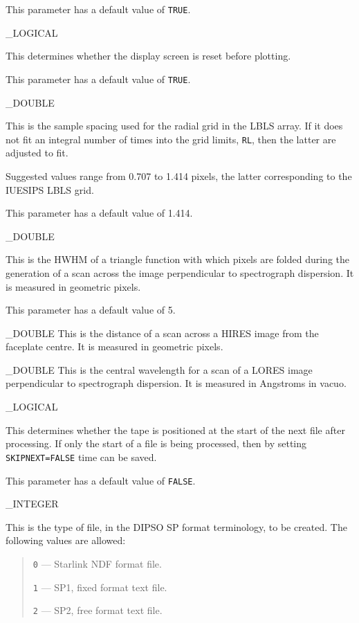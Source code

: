 {{   This parameter has a default value of \verb+TRUE+\@.
}

{
   \_LOGICAL
}{
   This determines whether the display screen is reset before plotting.

   This parameter has a default value of \verb+TRUE+\@.
}

{
   \_DOUBLE
}{
   This is the sample spacing used for the radial grid in the LBLS array.
   If it does not fit an integral number of times into the grid limits,
   \verb+RL+, then the latter are adjusted to fit.

   Suggested values range from 0.707 to 1.414 pixels, the latter
   corresponding to the IUESIPS LBLS grid.

   This parameter has a default value of 1.414.
}

{
   \_DOUBLE
}{
   This is the HWHM of a triangle function with which pixels are folded
   during the generation of a scan across the image perpendicular to
   spectrograph dispersion.
   It is measured in geometric pixels.

   This parameter has a default value of 5.
}

{
   \_DOUBLE
}{
   This is the distance of a scan across a HIRES image from the faceplate
   centre.
   It is measured in geometric pixels.
}

{
   \_DOUBLE
}{
   This is the central wavelength for a scan of a LORES image
   perpendicular to spectrograph dispersion.
   It is measured in Angstroms in vacuo.
}

{
   \_LOGICAL
}{
   This determines whether the tape is positioned at the start of the
   next file after processing.
   If only the start of a file is being processed, then by setting
   \verb+SKIPNEXT=FALSE+ time can be saved.

   This parameter has a default value of \verb+FALSE+\@.
}

{
   \_INTEGER
}{
   This is the type of file, in the DIPSO SP format terminology, to be
   created. The following values are allowed:

   \begin {quote}
   \begin {description}
      \item {\tt 0} --- Starlink NDF format file.
      \item {\tt 1} --- SP1, fixed format text file.
      \item {\tt 2} --- SP2, free format text file.
   \end {description}
   \end {quote}

}}
